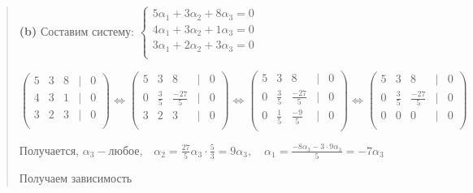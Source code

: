 \documentclass{article}
\begin{document}
\begin{quote}
    \textbf{(b)}
    Составим систему:
    $
    \begin{cases}
        5\alpha_1 + 3\alpha_2 + 8\alpha_3 = 0 \\
        4\alpha_1 + 3\alpha_2 + 1\alpha_3 = 0 \\
        3\alpha_1 + 2\alpha_2 + 3\alpha_3 = 0 \\
    \end{cases}
    $
    
    $
    \begin{pmatrix}
        5 & 3 & 8 & | & 0 \\
        4 & 3 & 1 & | & 0 \\
        3 & 2 & 3 & | & 0 \\
    \end{pmatrix} \Leftrightarrow
    \begin{pmatrix}
        5 & 3 & 8 & | & 0 \\
        0 & \frac{3}{5} & \frac{-27}{5} & | & 0 \\
        3 & 2 & 3 & | & 0 \\
    \end{pmatrix} \Leftrightarrow
    \begin{pmatrix}
        5 & 3 & 8 & | & 0 \\
        0 & \frac{3}{5} & \frac{-27}{5} & | & 0 \\
        0 & \frac{1}{5} & \frac{-9}{5} & | & 0 \\
    \end{pmatrix} \Leftrightarrow
     \begin{pmatrix}
        5 & 3 & 8 & | & 0 \\
        0 & \frac{3}{5} & \frac{-27}{5} & | & 0 \\
        0 & 0 & 0 & | & 0 \\
    \end{pmatrix} 
    $
    
Получается, $\alpha_3 - \text{любое,} \quad \alpha_2 = \frac{27}{5}\alpha_3 \cdot \frac{5}{3} = 9\alpha_3, \quad \alpha_1 =\frac{-8 \alpha_3 - 3 \cdot 9 \alpha_3}{5} = -7\alpha_3$

Получаем зависимость 
\end{quote}
\end{document}
